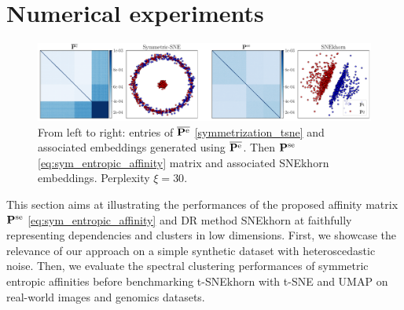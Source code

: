 \section{Numerical experiments}\label{sec:DR_experiments}


\begin{figure}
    \centering
    \includegraphics[width=\linewidth]{figures/SNEkhorn/heteroscedastic_noise.pdf}    \caption{From left to right: entries of $\overline{\mathbf{P}^{\mathrm{e}}}$ \eqref{symmetrization_tsne} and associated embeddings generated using $\overline{\mathbf{P}^{\mathrm{e}}}$. Then $\mathbf{P}^{\mathrm{se}}$ \eqref{eq:sym_entropic_affinity} matrix and associated SNEkhorn embeddings. Perplexity $\xi = 30$.}
    \label{fig:simulated_data_multinomial}
\end{figure}

This section aims at illustrating the performances of the proposed affinity
matrix $\mathbf{P}^{\mathrm{se}}$ \eqref{eq:sym_entropic_affinity} and DR method SNEkhorn at faithfully representing dependencies and
clusters in low dimensions. First, we showcase the relevance of our approach on a simple synthetic dataset with heteroscedastic noise. 
Then, we evaluate the spectral clustering
performances of symmetric entropic affinities before benchmarking
t-SNEkhorn with t-SNE and UMAP \citep{mcinnes2018umap} on real-world images and genomics datasets.

